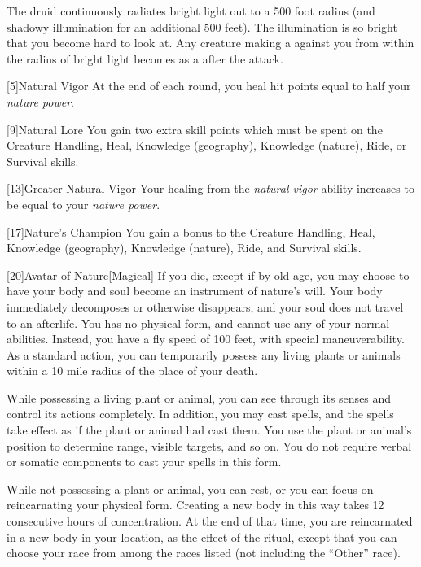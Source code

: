         The druid continuously radiates bright light out to a 500 foot radius (and shadowy illumination for an additional 500 feet).
        The illumination is so bright that you become hard to look at.
        Any creature making a  against you from within the radius of bright light becomes \dazzled as a  after the attack.

        [5]{Natural Vigor}
        At the end of each round, you heal hit points equal to half your \textit{nature power}.

        [9]{Natural Lore}
        You gain two extra skill points which must be spent on the Creature Handling, Heal, Knowledge (geography), Knowledge (nature), Ride, or Survival skills.

        [13]{Greater Natural Vigor}
        Your healing from the \textit{natural vigor} ability increases to be equal to your \textit{nature power}.

        [17]{Nature's Champion}
        You gain a  bonus to the Creature Handling, Heal, Knowledge (geography), Knowledge (nature), Ride, and Survival skills.

        [20]{Avatar of Nature}[Magical]
        If you die, except if by old age, you may choose to have your body and soul become an instrument of nature's will.
        Your body immediately decomposes or otherwise disappears, and your soul does not travel to an afterlife.
        You has no physical form, and cannot use any of your normal abilities.
        Instead, you have a fly speed of 100 feet, with special maneuverability.
        As a standard action, you can temporarily possess any living plants or animals within a 10 mile radius of the place of your death.

        While possessing a living plant or animal, you can see through its senses and control its actions completely.
        In addition, you may cast spells, and the spells take effect as if the plant or animal had cast them.
        You use the plant or animal's position to determine range, visible targets, and so on.
        You do not require verbal or somatic components to cast your spells in this form.

        While not possessing a plant or animal, you can rest, or you can focus on reincarnating your physical form.
        Creating a new body in this way takes 12 consecutive hours of concentration.
        At the end of that time, you are reincarnated in a new body in your location, as the effect of the  ritual, except that you can choose your race from among the races listed (not including the ``Other'' race).

